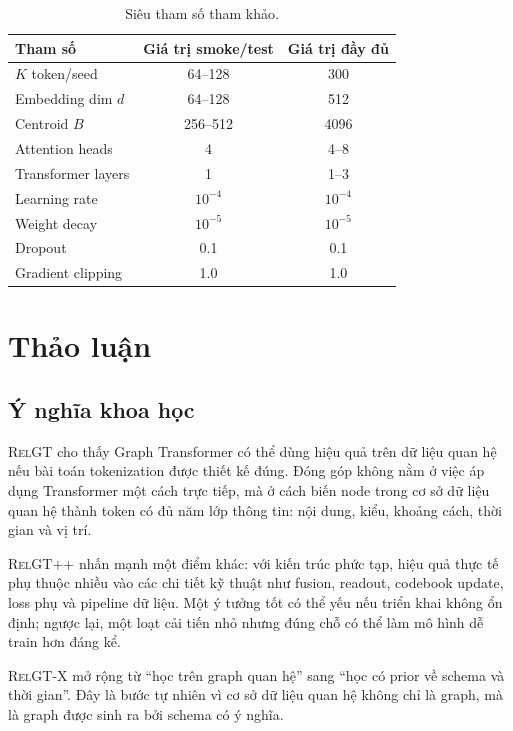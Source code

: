 \documentclass[12pt,a4paper]{article}
\newcommand{\RelGT}{\textsc{RelGT}}
\newcommand{\RelGTpp}{\textsc{RelGT++}}
\newcommand{\RelGTx}{\textsc{RelGT-X}}
\begin{document}
\begin{table}[H]
\centering
\caption{Siêu tham số tham khảo.}
\begin{tabular}{lcc}
\toprule
\textbf{Tham số} & \textbf{Giá trị smoke/test} & \textbf{Giá trị đầy đủ} \\
\midrule
$K$ token/seed & 64--128 & 300 \\
Embedding dim $d$ & 64--128 & 512 \\
Centroid $B$ & 256--512 & 4096 \\
Attention heads & 4 & 4--8 \\
Transformer layers & 1 & 1--3 \\
Learning rate & $10^{-4}$ & $10^{-4}$ \\
Weight decay & $10^{-5}$ & $10^{-5}$ \\
Dropout & 0.1 & 0.1 \\
Gradient clipping & 1.0 & 1.0 \\
\bottomrule
\end{tabular}
\end{table}

\section{Thảo luận}

\subsection{Ý nghĩa khoa học}

\RelGT{} cho thấy Graph Transformer có thể dùng hiệu quả trên dữ liệu quan hệ
nếu bài toán tokenization được thiết kế đúng. Đóng góp không nằm ở việc áp
dụng Transformer một cách trực tiếp, mà ở cách biến node trong cơ sở dữ liệu
quan hệ thành token có đủ năm lớp thông tin: nội dung, kiểu, khoảng cách,
thời gian và vị trí.

\RelGTpp{} nhấn mạnh một điểm khác: với kiến trúc phức tạp, hiệu quả thực tế
phụ thuộc nhiều vào các chi tiết kỹ thuật như fusion, readout, codebook update,
loss phụ và pipeline dữ liệu. Một ý tưởng tốt có thể yếu nếu triển khai không
ổn định; ngược lại, một loạt cải tiến nhỏ nhưng đúng chỗ có thể làm mô hình
dễ train hơn đáng kể.

\RelGTx{} mở rộng từ ``học trên graph quan hệ'' sang ``học có prior về schema
và thời gian''. Đây là bước tự nhiên vì cơ sở dữ liệu quan hệ không chỉ là
graph, mà là graph được sinh ra bởi schema có ý nghĩa.
\end{document}
